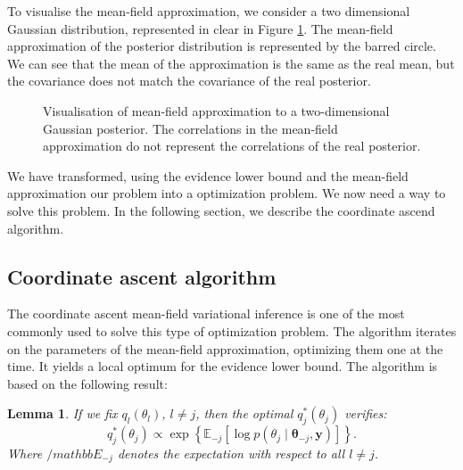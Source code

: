 \documentclass{article}
\numberwithin{equation}{section}
\newtheorem{lemma}{Lemma}[section]
\begin{document}
To visualise the mean-field approximation, we consider a two dimensional Gaussian distribution, represented in clear in Figure \ref{fig:mean_field}. The mean-field approximation of the posterior distribution is represented by the barred circle. We can see that the mean of the approximation is the same as the real mean, but the covariance does not match the covariance of the real posterior.

\begin{figure}[h!]
\centering
{}
\caption{\label{fig:mean_field}Visualisation of mean-field approximation to a two-dimensional Gaussian posterior. The correlations in the mean-field approximation do not represent the correlations of the real posterior.}
\end{figure}

We have transformed, using the evidence lower bound and the mean-field approximation our problem into a optimization problem. We now need a way to solve this problem. In the following section, we describe the coordinate ascend algorithm.
\subsection{Coordinate ascent algorithm}
The coordinate ascent mean-field variational inference  is one of the most commonly used to solve this type of optimization problem. The algorithm iterates on the parameters of the mean-field approximation, optimizing them one at the time. It yields a local optimum for the evidence lower bound. The algorithm is based on the following result:
\begin{lemma}

If we fix $q_l(\theta_l)$, $l\neq j$, then the optimal $q^*_j(\theta_j)$ verifies:
\begin{equation*}
q^*_j(\theta_j) \propto \exp\left\lbrace\mathbb{E}_{-j}\left[\log p(\theta_j \mid \boldsymbol{\theta}_{-j}, \boldsymbol{y})\right]\right\rbrace.
\end{equation*}
Where $/mathbb{E}_{-j}$ denotes the expectation with respect to all $l \neq j$.
\end{lemma}
\end{document}
